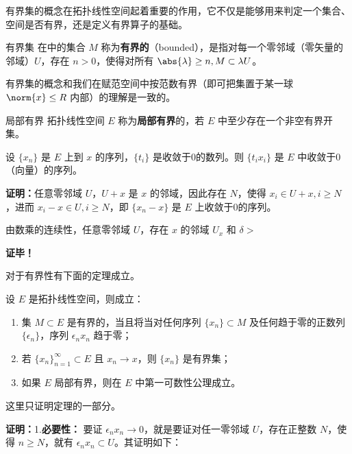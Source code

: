 
有界集的概念在拓扑线性空间起着重要的作用，它不仅是能够用来判定一个集合、空间是否有界，还是定义有界算子的基础。

\begin{definition}{有界集}\label{def_BudSet_1}
在中的集合 $M$ 称为\textbf{有界的}（bounded），是指对每一个零邻域（零矢量的邻域）$U$，存在 $n>0$，使得对所有 $\abs{\lambda}\geq n,M\subset \lambda U$。 
\end{definition}
有界集的概念和我们在赋范空间中按范数有界（即可把集置于某一球 $\norm{x}\leq R$ 内部）的理解是一致的。

\begin{definition}{局部有界}
拓扑线性空间 $E$ 称为\textbf{局部有界}的，若 $E$ 中至少存在一个非空有界开集。
\end{definition}

\begin{lemma}{}
设 $\{x_n\}$ 是 $E$ 上到 $x$ 的序列，$\{t_i\}$ 是收敛于0的数列。则 $\{t_ix_i\}$ 是 $E$ 中收敛于0（向量）的序列。
\end{lemma}

\textbf{证明：}任意零邻域 $U$，$U+x$ 是 $x$ 的邻域，因此存在 $N$，使得 $x_i\in U+x,i\geq N$，进而 $x_i-x\in U,i\geq N$，即 $\{x_n-x\}$ 是 $E$ 上收敛于0的序列。

由数乘的连续性，任意零邻域 $U$，存在 $x$ 的邻域 $U_x$ 和 $\delta>$


\textbf{证毕！}


对于有界性有下面的定理成立。
\begin{theorem}{}\label{the_BudSet_1}
设 $E$ 是拓扑线性空间，则成立：
\begin{enumerate}
\item 集 $M\subset E$ 是有界的，当且将当对任何序列 $\{x_n\}\subset M$ 及任何趋于零的正数列 $\{\epsilon_n\}$，序列 $\epsilon_n x_n$ 趋于零；
\item 若 $\{x_n\}_{n=1}^\infty\subset E$ 且 $x_n\rightarrow x$，则 $\{x_n\}$ 是有界集；
\item 如果 $E$ 局部有界，则在 $E$ 中第一可数性公理成立。 
\end{enumerate}

\end{theorem}
这里只证明定理的一部分。

\textbf{证明：}1.\textbf{必要性：} 要证 $\epsilon_n x_n\rightarrow0$，就是要证对任一零邻域 $U$，存在正整数 $N$，使得 $n\geq N$，就有 $\epsilon_n x_n\subset U$。其证明如下：


